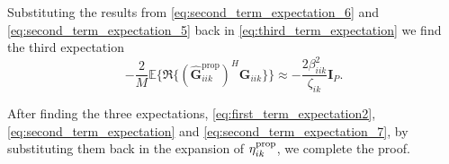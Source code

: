 \documentclass[journal,12pt,onecolumn]{IEEEtran}
\begin{document}
Substituting the results from \eqref{eq:second_term_expectation_6} and \eqref{eq:second_term_expectation_5} back in \eqref{eq:third_term_expectation} we find the third expectation
\begin{equation}\label{eq:second_term_expectation_7}
-\frac{2}{M} \mathbb{E} \{\mathfrak{R}\{ (\hat{\textbf{G}}_{iik}^{\text{prop}})^{H} \textbf{G}_{iik} \}\} \approx -\frac{2 \beta_{iik}^{2}}{\zeta_{ik}} \textbf{I}_{P}.
\end{equation}

After finding the three expectations, \eqref{eq:first_term_expectation2}, \eqref{eq:second_term_expectation} and \eqref{eq:second_term_expectation_7}, by substituting them back in the expansion of $\eta_{ik}^{\text{\text{prop}}}$, we complete the proof.

\end{document}
